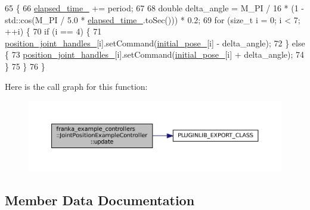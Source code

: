 \begin{DoxyCode}
65                                                                        \{
66   \hyperlink{classfranka__example__controllers_1_1JointPositionExampleController_acdbb7dc1611653a0c6bed1d94dc0c979}{elapsed\_time\_} += period;
67 
68   \textcolor{keywordtype}{double} delta\_angle = M\_PI / 16 * (1 - std::cos(M\_PI / 5.0 * \hyperlink{classfranka__example__controllers_1_1JointPositionExampleController_acdbb7dc1611653a0c6bed1d94dc0c979}{elapsed\_time\_}.toSec())) * 0.2;
69   \textcolor{keywordflow}{for} (\textcolor{keywordtype}{size\_t} i = 0; i < 7; ++i) \{
70     \textcolor{keywordflow}{if} (i == 4) \{
71       \hyperlink{classfranka__example__controllers_1_1JointPositionExampleController_acaa5902db27586e01e48939526e27e5a}{position\_joint\_handles\_}[i].setCommand(\hyperlink{classfranka__example__controllers_1_1JointPositionExampleController_aec370794d28554126ba021f10c8216ce}{initial\_pose\_}[i] - 
      delta\_angle);
72     \} \textcolor{keywordflow}{else} \{
73       \hyperlink{classfranka__example__controllers_1_1JointPositionExampleController_acaa5902db27586e01e48939526e27e5a}{position\_joint\_handles\_}[i].setCommand(\hyperlink{classfranka__example__controllers_1_1JointPositionExampleController_aec370794d28554126ba021f10c8216ce}{initial\_pose\_}[i] + 
      delta\_angle);
74     \}
75   \}
76 \}
\end{DoxyCode}
Here is the call graph for this function\+:
\nopagebreak
\begin{figure}[H]
\begin{center}
\leavevmode
\includegraphics[width=350pt]{classfranka__example__controllers_1_1JointPositionExampleController_a3475db8f06dde9e37fd03660ef4d1cb0_cgraph}
\end{center}
\end{figure}


\subsection{Member Data Documentation}
\mbox{\label{classfranka__example__controllers_1_1JointPositionExampleController_acdbb7dc1611653a0c6bed1d94dc0c979}} 
